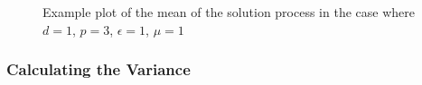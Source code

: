 \begin{figure}
    \centering
    \begin{subfigure}[b]{0.65\textwidth}
        \centering
    \end{subfigure}
    \begin{subfigure}[b]{0.55\textwidth}
        \centering
    \end{subfigure}
    \caption{Example plot of the mean of the solution process in the case where
    $d = 1$, $p = 3$, $\epsilon = 1$, $\mu = 1$}
    \label{fig:twod-stochastic-mean-plots}
\end{figure}

\subsubsection{Calculating the Variance}

